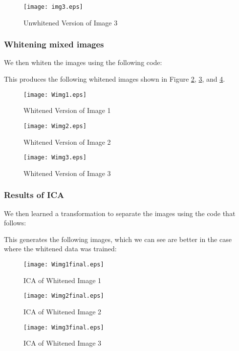 \documentclass[11pt, oneside]{article}
\begin{document}
\begin{figure}[ht!]
\texttt{[image: img3.eps]}
\caption{Unwhitened Version of Image 3}
\label{fig:img3}
\end{figure}

\subsubsection{Whitening mixed images}

We then whiten the images using the following code:

This produces the following whitened images shown in Figure \ref{fig:Wimg1}, \ref{fig:Wimg2}, and \ref{fig:Wimg3}.

\begin{figure}[ht!]
\texttt{[image: Wimg1.eps]}
\caption{Whitened Version of Image 1}
\label{fig:Wimg1}
\end{figure}

\begin{figure}[ht!]
\texttt{[image: Wimg2.eps]}
\caption{Whitened Version of Image 2}
\label{fig:Wimg2}
\end{figure}

\begin{figure}[ht!]
\texttt{[image: Wimg3.eps]}
\caption{Whitened Version of Image 3}
\label{fig:Wimg3}
\end{figure}


\subsubsection{Results of ICA}

We then learned a transformation to separate the images using the code that follows:

This generates the following images, which we can see are better in the case where the whitened data was trained:
\begin{figure}[ht!]
\texttt{[image: Wimg1final.eps]}
\caption{ICA of Whitened Image 1}
\label{fig:ICAWimg1}
\end{figure}

\begin{figure}[ht!]
\texttt{[image: Wimg2final.eps]}
\caption{ICA of Whitened Image 2}
\label{fig:ICAWimg2}
\end{figure}

\begin{figure}[ht!]
\texttt{[image: Wimg3final.eps]}
\caption{ICA of Whitened Image 3}
\label{fig:ICAWimg3}
\end{figure}
\end{document}
